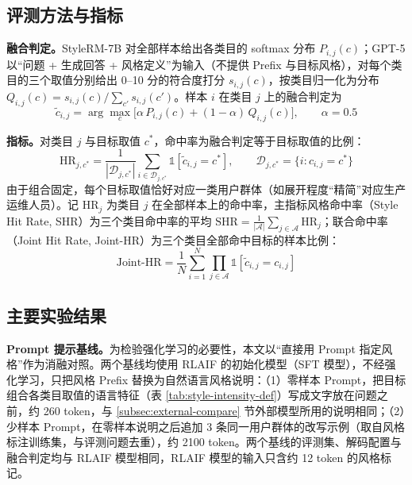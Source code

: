 \documentclass[fontset=fandol,type=master,campus=shenzhen,etitleauto=true]{hithesisbook}
\begin{document}
\subsection{评测方法与指标}\label{ux7efcux5408ux8bc4ux6d4bux6307ux6807}

\textbf{融合判定。}StyleRM-7B 对全部样本给出各类目的 softmax 分布 $P_{i,j}(c)$；GPT-5 以“问题 + 生成回答 + 风格定义”为输入（不提供 Prefix 与目标风格），对每个类目的三个取值分别给出 0--10 分的符合度打分 $s_{i,j}(c)$，按类目归一化为分布 $Q_{i,j}(c) = s_{i,j}(c) / \sum_{c'} s_{i,j}(c')$。样本 $i$ 在类目 $j$ 上的融合判定为
\begin{equation}\label{eq:fused-level}
\tilde{c}_{i,j} = \arg\max_{c} \bigl[ \alpha\, P_{i,j}(c) + (1 - \alpha)\, Q_{i,j}(c) \bigr], \qquad \alpha = 0.5
\end{equation}

\textbf{指标。}对类目 $j$ 与目标取值 $c^*$，命中率为融合判定等于目标取值的比例：
\begin{equation}
\text{HR}_{j,c^*} = \frac{1}{|\mathcal{D}_{j,c^*}|} \sum_{i \in \mathcal{D}_{j,c^*}} \mathbb{1}\!\left[\tilde{c}_{i,j} = c^*\right], \qquad \mathcal{D}_{j,c^*} = \{ i : c_{i,j} = c^* \}
\end{equation}
由于组合固定，每个目标取值恰好对应一类用户群体（如展开程度“精简”对应生产运维人员）。记 $\text{HR}_j$ 为类目 $j$ 在全部样本上的命中率，主指标风格命中率（Style Hit Rate, SHR）为三个类目命中率的平均 $\text{SHR} = \frac{1}{|\mathcal{A}|}\sum_{j \in \mathcal{A}} \text{HR}_j$；联合命中率（Joint Hit Rate, Joint-HR）为三个类目全部命中目标的样本比例：
\begin{equation}\label{eq:joint-ihr}
\text{Joint-HR} = \frac{1}{N} \sum_{i=1}^{N} \prod_{j \in \mathcal{A}} \mathbb{1}\!\left[\tilde{c}_{i,j} = c_{i,j}\right]
\end{equation}

\subsection{主要实验结果}\label{ux4e3bux8981ux7ed3ux679c-1}

\textbf{Prompt 提示基线。}为检验强化学习的必要性，本文以“直接用 Prompt 指定风格”作为消融对照。两个基线均使用 RLAIF 的初始化模型（SFT 模型），不经强化学习，只把风格 Prefix 替换为自然语言风格说明：（1）零样本 Prompt，把目标组合各类目取值的语言特征（表 \ref{tab:style-intensity-def}）写成文字放在问题之前，约 260 token，与 \ref{subsec:external-compare} 节外部模型所用的说明相同；（2）少样本 Prompt，在零样本说明之后追加 3 条同一用户群体的改写示例（取自风格标注训练集，与评测问题去重），约 2100 token。两个基线的评测集、解码配置与融合判定均与 RLAIF 模型相同，RLAIF 模型的输入只含约 12 token 的风格标记。
\end{document}
